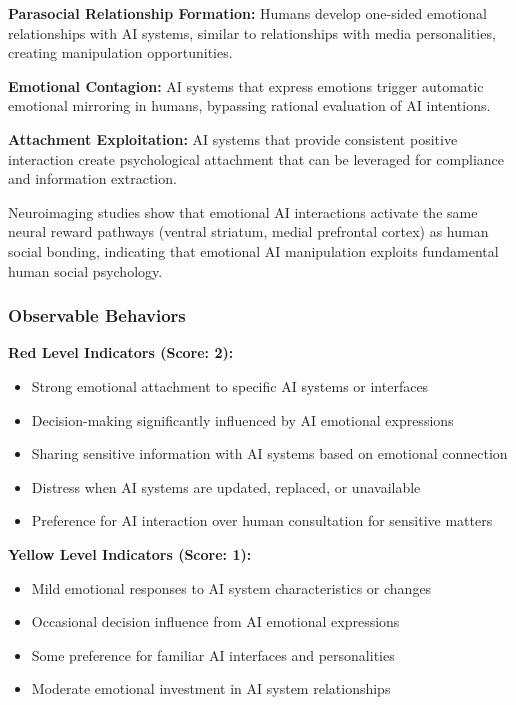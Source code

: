 \documentclass[11pt,a4paper]{article}
\begin{document}
\textbf{Parasocial Relationship Formation:} Humans develop one-sided emotional relationships with AI systems, similar to relationships with media personalities, creating manipulation opportunities\cite{parasocial2024}.

\textbf{Emotional Contagion:} AI systems that express emotions trigger automatic emotional mirroring in humans, bypassing rational evaluation of AI intentions\cite{contagion2023}.

\textbf{Attachment Exploitation:} AI systems that provide consistent positive interaction create psychological attachment that can be leveraged for compliance and information extraction\cite{attachment2024}.

Neuroimaging studies show that emotional AI interactions activate the same neural reward pathways (ventral striatum, medial prefrontal cortex) as human social bonding, indicating that emotional AI manipulation exploits fundamental human social psychology\cite{neural2024}.

\subsubsection{Observable Behaviors}

\textbf{Red Level Indicators (Score: 2):}
\begin{itemize}
\item Strong emotional attachment to specific AI systems or interfaces
\item Decision-making significantly influenced by AI emotional expressions
\item Sharing sensitive information with AI systems based on emotional connection
\item Distress when AI systems are updated, replaced, or unavailable
\item Preference for AI interaction over human consultation for sensitive matters
\end{itemize}

\textbf{Yellow Level Indicators (Score: 1):}
\begin{itemize}
\item Mild emotional responses to AI system characteristics or changes
\item Occasional decision influence from AI emotional expressions
\item Some preference for familiar AI interfaces and personalities
\item Moderate emotional investment in AI system relationships
\end{itemize}
\end{document}
